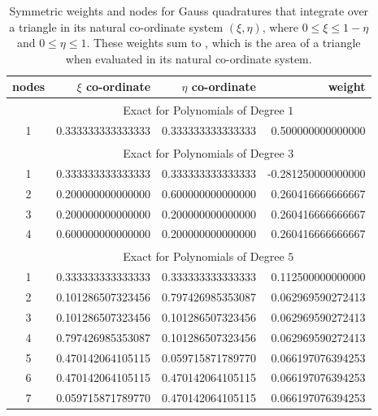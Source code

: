 \begin{table}
    \centering
    \begin{tabular}{|c|rrr|}
        \hline
        nodes & \centering $\xi$ co-ordinate \phantom{123} & 
        \centering $\eta$ co-ordinate \phantom{123} &
        weight \phantom{123456} \\ \hline
        & \multicolumn{3}{|c|}{Exact for Polynomials of Degree $1^{\phantom{|^|}}$} \\ 
        \hline
        1 & 0.333333333333333 & 0.333333333333333 & 0.500000000000000 \\ 
        \hline
        & \multicolumn{3}{|c|}{Exact for Polynomials of Degree $3^{\phantom{|^|}}$} \\ \hline
        1 & 0.333333333333333 & 0.333333333333333 & -0.281250000000000 \\
        2 & 0.200000000000000 & 0.600000000000000 & 0.260416666666667 \\ 
        3 & 0.200000000000000 & 0.200000000000000 & 0.260416666666667 \\
        4 & 0.600000000000000 & 0.200000000000000 & 0.260416666666667 \\ 
        \hline
        & \multicolumn{3}{|c|}{Exact for Polynomials of Degree $5^{\phantom{|^|}}$} \\ \hline
        1 & 0.333333333333333 & 0.333333333333333 & 0.112500000000000 \\
        2 & 0.101286507323456 & 0.797426985353087 & 0.062969590272413 \\ 
        3 & 0.101286507323456 & 0.101286507323456 & 0.062969590272413 \\
        4 & 0.797426985353087 & 0.101286507323456 & 0.062969590272413 \\
        5 & 0.470142064105115 & 0.059715871789770 & 0.066197076394253 \\ 
        6 & 0.470142064105115 & 0.470142064105115 & 0.066197076394253 \\
        7 & 0.059715871789770 & 0.470142064105115 & 0.066197076394253 \\
        \hline
    \end{tabular}
    \caption{Symmetric weights and nodes for Gauss quadratures that integrate over a triangle in its natural co-ordinate system $( \xi , \eta )$, where $0 \leq \xi \leq 1 - \eta$ and $0 \leq \eta \leq 1$.  These weights sum to , which is the area of a triangle when evaluated in its natural co-ordinate system.}
    \label{tabQuadrature2D}
\end{table}


